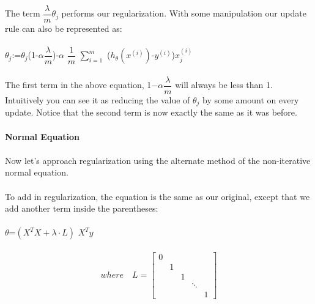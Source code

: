\documentclass[UTF8]{ctexart}
\begin{document}
\paragraph{}
The term $\dfrac{\lambda}{m}\theta_{j}$ performs our regularization. With some manipulation our update rule can also be represented as:
\paragraph{}
$\theta_{j}$:=$\theta_{j}$(1-$\alpha \dfrac{\lambda}{m}$)-$\alpha$ $\dfrac{1}{m}$ $\sum_{i=1}^m$ ($h_{\theta}(x^{(i)})$-$y^{(i)}$)$x_{j}^{(i)}$
\paragraph{}
The first term in the above equation, 1−$\alpha\dfrac{\lambda}{m}$ will always be less than 1. Intuitively you can see it as reducing the value of $\theta_{j}$ by some amount on every update. Notice that the second term is now exactly the same as it was before.
\paragraph{}
\textbf{Normal Equation}
\paragraph{}
Now let's approach regularization using the alternate method of the non-iterative normal equation.
\paragraph{}
To add in regularization, the equation is the same as our original, except that we add another term inside the parentheses:
\paragraph{}
\begin{algorithm}
\paragraph{}
$\theta$=$\left(X^{T}X+\lambda\cdot L \right)$ $X^{T}y$
\paragraph{}
\[ where \quad L=\begin{bmatrix}
0\\
&1\\
&&1\\
&&&\ddots\\
&&&&1
\end{bmatrix} \]
\end{algorithm}
\end{document}
